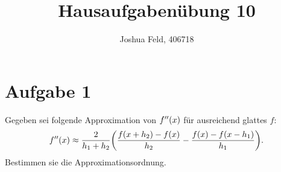 \documentclass{exercise}
\institute{Applied and Computational Mathematics}
\title{Hausaufgabenübung 10}
\author{Joshua Feld, 406718}
\begin{document}
    \maketitle


    \section*{Aufgabe 1}
    
    \begin{problem}
        Gegeben sei folgende Approximation von \(f''\parentheses*{x}\) für ausreichend glattes \(f\):
        \[
            f''\parentheses*{x} \approx \frac{2}{h_1 + h_2}\parentheses*{\frac{f\parentheses*{x + h_2} - f\parentheses*{x}}{h_2} - \frac{f\parentheses*{x} - f\parentheses*{x - h_1}}{h_1}}.
        \]
        Bestimmen sie die Approximationsordnung.
    \end{problem}
    
\end{document}
